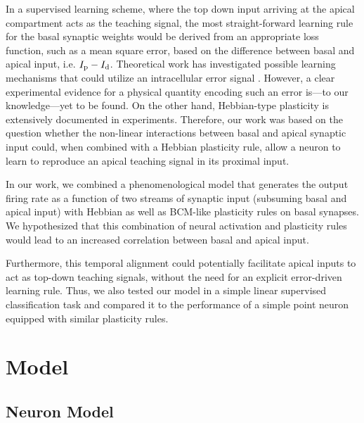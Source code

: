 \documentclass[10pt,a4paper,twocolumn]{article}
\begin{document}
		In a supervised learning scheme, where the top down input
		arriving at the apical compartment acts as the teaching signal,
		the most straight-forward learning rule for the basal synaptic
		weights would be derived from an appropriate loss function,
		such as a mean square error, based on the difference between 
		basal and apical input, i.e. $I_{\rm p} - I_{\rm d}$. Theoretical work has 
		investigated possible learning mechanisms
		that could utilize an intracellular error signal
		\citep{Urbanczik_2014,Schiess_2016,Guerguiev_2017}.
		However, a clear experimental
		evidence for a physical quantity encoding such an error 
		is---to our knowledge---yet to be found. 
		On the other hand, Hebbian-type plasticity is extensively
		documented in experiments. Therefore, our work was
		based on the question whether the non-linear interactions
		between basal and apical synaptic input could, when
		combined with a Hebbian plasticity rule, allow a neuron
		to learn to reproduce an apical teaching signal in its
		proximal input.
		
		In our work, we combined a phenomenological model that generates the output
		firing rate as a function of two streams of synaptic input (subsuming basal and apical input)
		with Hebbian as well as BCM-like plasticity rules on basal synapses. We hypothesized that 
		this combination of neural activation and plasticity rules would lead to an
		increased correlation between basal and apical input.
		
		Furthermore, this temporal alignment could potentially facilitate apical inputs to act
		as top-down teaching signals, without the need for an explicit error-driven
		learning rule. Thus, we also tested our model in a simple linear 
		supervised classification task and compared it to the performance of a simple
		point neuron equipped with similar plasticity rules.
		
		\section{Model}
		
		\subsection{Neuron Model}
		
\end{document}
